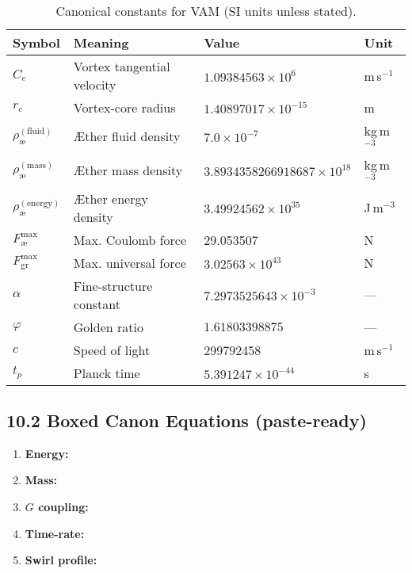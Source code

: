 \documentclass[11pt]{article}
\begin{document}
\begin{table}[h!]
\centering
\begin{tabular}{|l|l|l|l|}
\hline
\textbf{Symbol} & \textbf{Meaning} & \textbf{Value} & \textbf{Unit} \\
\hline
$C_e$ & Vortex tangential velocity & $1.09384563\times 10^{6}$ & m\,s$^{-1}$ \\
$r_c$ & Vortex-core radius & $1.40897017\times 10^{-15}$ & m \\
$\rho_{\text{\ae}}^{(\text{fluid})}$ & Æther fluid density & $7.0\times 10^{-7}$ & kg\,m$^{-3}$ \\
$\rho_{\text{\ae}}^{(\text{mass})}$ & Æther mass density & $3.8934358266918687\times 10^{18}$ & kg\,m$^{-3}$ \\
$\rho_{\text{\ae}}^{(\text{energy})}$ & Æther energy density & $3.49924562\times 10^{35}$ & J\,m$^{-3}$ \\
$F_{\text{\ae}}^{\max}$ & Max. Coulomb force & 29.053507 & N \\
$F_{\text{gr}}^{\max}$ & Max. universal force & $3.02563\times 10^{43}$ & N \\
$\alpha$ & Fine-structure constant & $7.2973525643\times 10^{-3}$ & --- \\
$\varphi$ & Golden ratio & $1.61803398875$ & --- \\
$c$ & Speed of light & 299792458 & m\,s$^{-1}$ \\
$t_p$ & Planck time & $5.391247\times 10^{-44}$ & s \\
\hline
\end{tabular}
\caption{Canonical constants for VAM (SI units unless stated).}
\end{table}

\subsection*{10.2 Boxed Canon Equations (paste-ready)}

\begin{enumerate}
    \item \textbf{Energy:} 
    \item \textbf{Mass:} 
    \item \textbf{$G$ coupling:} 
    \item \textbf{Time-rate:} 
    \item \textbf{Swirl profile:} 
\end{enumerate}
\end{document}
